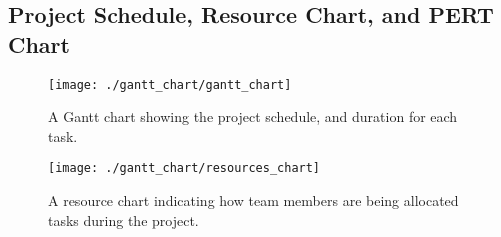 \documentclass[letter,12pt]{article}
\begin{document}
\subsection{Project Schedule, Resource Chart, and PERT Chart}
\label{ssec:projscheduleandresourcenpertcharts}

%	
%		
%		
%		

\begin{landscape}
\centering
	\begin{figure}[ht]
	\begin{minipage}[b]{9.5in}
	\setlength{\unitlength}{0.2in}
	\texttt{[image: ./gantt\_chart/gantt\_chart]}
	\caption{A Gantt chart showing the project schedule, and duration for each task.}
	\label{fig:ganttchart}
	\end{minipage}

	\vspace{2in}
	
	\begin{minipage}[b]{9.5in}
	\setlength{\unitlength}{0.2in}
	\texttt{[image: ./gantt\_chart/resources\_chart]}
	\caption{A resource chart indicating how team members are being allocated tasks during the project.}
	\label{fig:resourceschart}
	\end{minipage}
	
	\end{figure}
\end{landscape}
\end{document}
